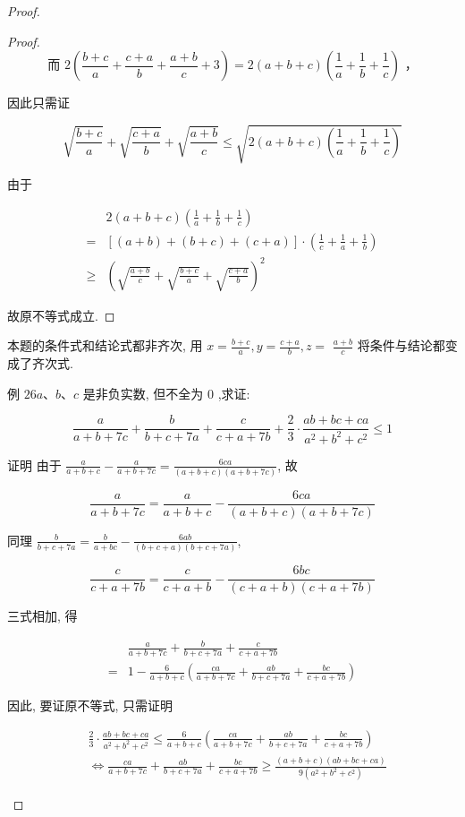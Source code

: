 \begin{proof}
\begin{example}
\begin{proof}
	$$
	\text { 而 } 2\left(\frac{b+c}{a}+\frac{c+a}{b}+\frac{a+b}{c}+3\right)=2(a+b+c)\left(\frac{1}{a}+\frac{1}{b}+\frac{1}{c}\right) \text { ， }
	$$
	
	因此只需证
	
	$$
	\sqrt{\frac{b+c}{a}}+\sqrt{\frac{c+a}{b}}+\sqrt{\frac{a+b}{c}} \leqslant \sqrt{2(a+b+c)\left(\frac{1}{a}+\frac{1}{b}+\frac{1}{c}\right)}
	$$
	
	由于
	
	$$
	\begin{aligned}
	& 2(a+b+c)\left(\frac{1}{a}+\frac{1}{b}+\frac{1}{c}\right) \\
	= & {[(a+b)+(b+c)+(c+a)] \cdot\left(\frac{1}{c}+\frac{1}{a}+\frac{1}{b}\right) } \\
	\geqslant & \left(\sqrt{\frac{a+b}{c}}+\sqrt{\frac{b+c}{a}}+\sqrt{\frac{c+a}{b}}\right)^{2}
	\end{aligned}
	$$
	
	故原不等式成立.
\end{proof}
\begin{note}
	本题的条件式和结论式都非齐次, 用 $x=\frac{b+c}{a}, y=\frac{c+a}{b}, z=$ $\frac{a+b}{c}$ 将条件与结论都变成了齐次式.
	
	例 $26 a 、 b 、 c$ 是非负实数, 但不全为 0 ,求证:
	
	$$
	\frac{a}{a+b+7 c}+\frac{b}{b+c+7 a}+\frac{c}{c+a+7 b}+\frac{2}{3} \cdot \frac{a b+b c+c a}{a^{2}+b^{2}+c^{2}} \leqslant 1
	$$
	
	证明 由于 $\frac{a}{a+b+c}-\frac{a}{a+b+7 c}=\frac{6 c a}{(a+b+c)(a+b+7 c)}$, 故
	
	$$
	\frac{a}{a+b+7 c}=\frac{a}{a+b+c}-\frac{6 c a}{(a+b+c)(a+b+7 c)}
	$$
	
	同理 $\frac{b}{b+c+7 a}=\frac{b}{a+b c}-\frac{6 a b}{(b+c+a)(b+c+7 a)}$,
	
	$$
	\frac{c}{c+a+7 b}=\frac{c}{c+a+b}-\frac{6 b c}{(c+a+b)(c+a+7 b)}
	$$
	
	三式相加, 得
	
	$$
	\begin{aligned}
	& \frac{a}{a+b+7 c}+\frac{b}{b+c+7 a}+\frac{c}{c+a+7 b} \\
	= & 1-\frac{6}{a+b+c}\left(\frac{c a}{a+b+7 c}+\frac{a b}{b+c+7 a}+\frac{b c}{c+a+7 b}\right)
	\end{aligned}
	$$
	
	因此, 要证原不等式, 只需证明
	
	$$
	\begin{aligned}
	& \frac{2}{3} \cdot \frac{a b+b c+c a}{a^{2}+b^{2}+c^{2}} \leqslant \frac{6}{a+b+c}\left(\frac{c a}{a+b+7 c}+\frac{a b}{b+c+7 a}+\frac{b c}{c+a+7 b}\right) \\
	& \Leftrightarrow \frac{c a}{a+b+7 c}+\frac{a b}{b+c+7 a}+\frac{b c}{c+a+7 b} \geqslant \frac{(a+b+c)(a b+b c+c a)}{9\left(a^{2}+b^{2}+c^{2}\right)}
	\end{aligned}
	$$
	

\end{note}
\end{example}
\end{proof}
